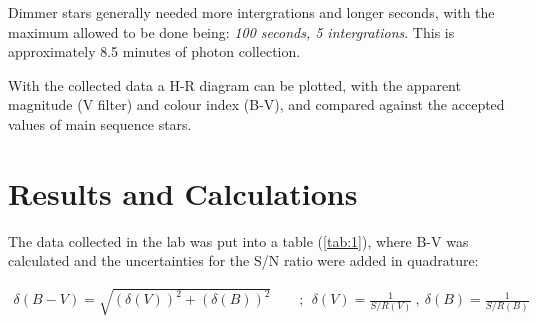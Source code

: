 \documentclass[12pt]{article}
\begin{document}
Dimmer stars generally needed more intergrations and longer seconds, with the maximum allowed to be done being: \textit{100 seconds, 5 intergrations}. This is approximately 8.5 minutes of photon collection.

With the collected data a H-R diagram can be plotted, with the apparent magnitude (V filter) and colour index (B-V), and compared against the accepted values of main sequence stars.

\section{Results and Calculations} \label{sec:3}

The data collected in the lab was put into a table (\ref{tab:1}), where B-V was calculated and the uncertainties for the S/N ratio were added in quadrature:

\vspace{-1.5ex}
\begin{gather*}
    \delta(B-V) = \sqrt{(\delta(V))^2 + (\delta(B))^2} \qquad ; \:\: \delta(V) = \frac{1}{S/R(V)} \: , \: \delta(B) = \frac{1}{S/R(B)}
\end{gather*}
\end{document}
